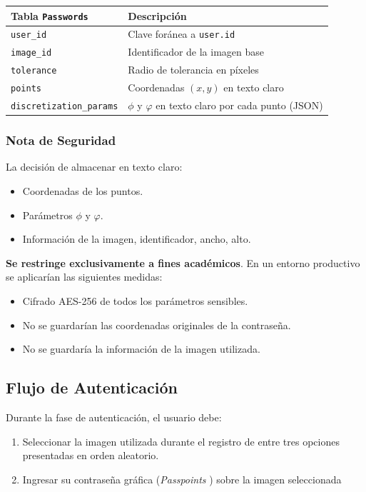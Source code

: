 \begin{table}[ht]
	\centering
	\begin{tabularx}{\textwidth}{lX}
		\toprule
		\textbf{Tabla \texttt{Passwords}} & \textbf{Descripción} \\
		\midrule
		\texttt{user\_id} & Clave foránea a \texttt{user.id} \\
		\texttt{image\_id} & Identificador de la imagen base \\
		\texttt{tolerance} & Radio de tolerancia en píxeles \\
		\texttt{points} & Coordenadas $(x,y)$ en texto claro \\
		\texttt{discretization\_params} & $\phi$ y $\varphi$ en texto claro por cada punto (JSON) \\
		\bottomrule
	\end{tabularx}
\end{table}

\subsubsection{Nota de Seguridad}
La decisión de almacenar en texto claro:
\begin{itemize}
	\item Coordenadas de los puntos.
	\item Parámetros $\phi$ y $\varphi$.
	\item Informaci\'on de la imagen, identificador, ancho, alto.
\end{itemize}

\textbf{Se restringe exclusivamente a fines académicos}. En un entorno productivo se aplicarían las siguientes medidas:
\begin{itemize}
	\item Cifrado AES-256 de todos los parámetros sensibles.
	\item No se guardar\'ian las coordenadas originales de la contrase\~na.
	\item No se guardar\'ia la informaci\'on de la imagen utilizada.
\end{itemize}

\subsection{Flujo de Autenticación}
Durante la fase de autenticación, el usuario debe:

\begin{enumerate}
	\item Seleccionar la imagen utilizada durante el registro de entre tres opciones presentadas en orden aleatorio.
	\item Ingresar su contraseña gráfica (\textit{Passpoints
}) sobre la imagen seleccionada
\end{enumerate}

